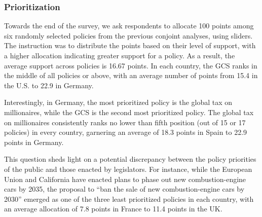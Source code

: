 \subsubsection{Prioritization}\label{subsubsec:prioritization} %

Towards the end of the survey, we ask respondents to allocate 100 points among six randomly selected policies from the previous conjoint analyses, using sliders. The instruction was to distribute the points based on their level of support, with a higher allocation indicating greater support for a policy. %
As a result, the average support across policies is 16.67 points. %
In each country, the GCS ranks in the middle of all policies or above, with an average number of points from 15.4 in the U.S. to 22.9 in Germany.%

Interestingly, in Germany, the most prioritized policy is the global tax on millionaires, while the GCS is the second most prioritized policy. The global tax on millionaires consistently ranks no lower than fifth position (out of 15 or 17 policies) in every country, garnering an average of 18.3 points in Spain to 22.9 points in Germany.

This question sheds light on a potential discrepancy between the policy priorities of the public and those enacted by legislators. For instance, while the European Union and California have enacted plans to phase out new combustion-engine cars by 2035, the proposal to ``ban the sale of new combustion-engine cars by 2030'' emerged as one of the three least prioritized policies in each country, with an average allocation of 7.8 points in France to 11.4 points in the UK.

